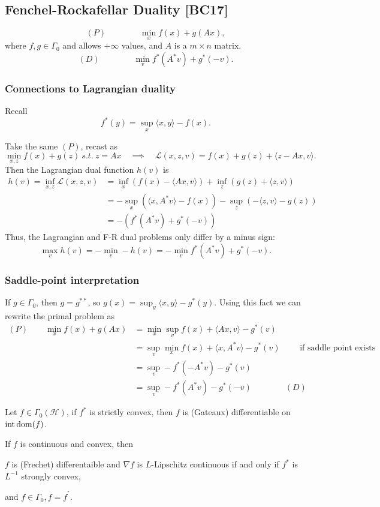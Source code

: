 \documentclass[class=article,crop=false]{standalone}
\begin{document}
\subsection{Fenchel-Rockafellar Duality [BC17]}

\[
	(P) \qquad \qquad \min_x f(x) + g(Ax)
,\]
where $ f,g \in \Gamma_0$ and allows $ +\infty$ values, and $ A$ is a  $ m\times n$ matrix. 
\[
	(D) \qquad \qquad \min_{v} f^* (A^* v) + g^* (-v)
.\]
\subsubsection{Connections to Lagrangian duality}
Recall
\[
	f^* (y) = \sup_{x} \langle x,y \rangle -f(x)
.\]

Take the same $ (P)$, recast as
 \[
	 \min_{x,z} f(x) + g(z)\ s.t.\ z=Ax \quad  \implies \quad  \mathscr{L}(x,z,v)=f(x)+g(z)+ \langle z-Ax,v \rangle
.\]
Then the Lagrangian dual function $ h(v)$ is
\begin{align*}
	h(v) = \inf_{x,z} \mathscr{L}(x,z,v) &= \inf_{x} (f(x)- \langle Ax,v \rangle) + \inf_{z} (g(z) + \langle z,v \rangle)\\
					     &= - \sup_{x} (\langle x,A^* v \rangle -f(x)) - \sup_{z}( - \langle z,v \rangle -g(z)) \\
					     &= -(f^* (A^* v) +g^* (-v))
\end{align*}
Thus, the Lagrangian and F-R dual problems only differ by a minus sign: \[ \max_v h(v) = -\min_v -h(v) = - \min_v f^* (A^* v) +g^* (-v).\]
\subsubsection{Saddle-point interpretation}

If $ g \in \Gamma_0$, then $ g=g^{**}$, so $ g(x) = \sup_y \langle x,y \rangle -g^* (y)$. Using this fact we can rewrite the primal problem as
\begin{align*}
	(P)\qquad  \min_x f(x) + g(Ax) &= \min_x \sup_v f(x) + \langle Ax,v \rangle - g^* (v) \\
				 &= \sup_v \min_x f(x) + \langle x,A^* v \rangle -g^* (v) \qquad \text{ if saddle point exists} \\
				 &= \sup_v -f^* (-A^* v) -g^* (v)\\
				 &= \sup_v -f^* (A^* v) - g^* (-v) \qquad \qquad (D)
\end{align*}

\begin{prop}[18.9]
	Let $ f \in \Gamma_0( \mathcal{ H})$, if $ f^* $ is strictly convex, then $ f$ is (Gateaux) differentiable on  $ \operatorname{int} \operatorname{dom}(f)$.
\end{prop}
\begin{prop}[18.15]
If $ f$ is continuous and convex, then

$ f$ is (Frechet) differentaible and  $ \nabla f$ is $L$-Lipschitz continuous if and only if $ f^* $ is $ L^{-1}$ strongly convex,

and $ f \in \Gamma_0, f=f^{^* } $.
\end{prop}
\end{document}
